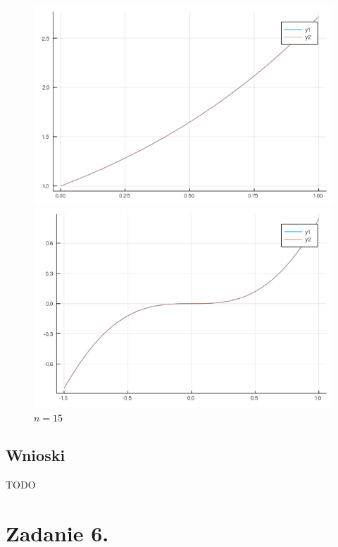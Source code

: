 \documentclass[11pt, a4paper]{article}
\begin{document}
\begin{figure}[H]
        \begin{minipage}{0.5\textwidth}
            \caption{$n=15$}
            \centering
            \includegraphics[width=\linewidth]{plot-5_a_n15}
        \end{minipage}
        \begin{minipage}{0.5\textwidth}
            \caption{$n=15$}
            \centering
            \includegraphics[width=\linewidth]{plot-5_b_n15}
        \end{minipage}
    \end{figure}
    \subsection{Wnioski}


    TODO



    \section{Zadanie 6.}
\end{document}
